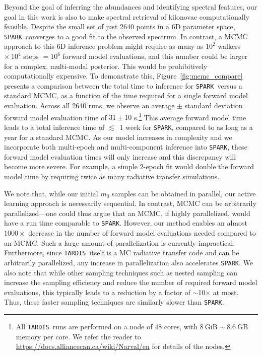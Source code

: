 \documentclass[twocolumn, twocolappendix]{aastex63}
\def\SPARK{\texttt{SPARK}}
\def\TARDIS{\texttt{TARDIS}}
\begin{document}
Beyond the goal of inferring the abundances and identifying spectral features, our goal in this work is also to make spectral retrieval of kilonovae computationally feasible. Despite the small set of just 2640 points in a 6D parameter space, \SPARK~converges to a good fit to the observed spectrum. In contrast, a MCMC approach to this 6D inference problem might require as many as $10^2$ walkers $\times~10^4$ steps $=10^6$ forward model evaluations, and this number could be larger for a complex, multi-modal posterior. This would be prohibitively computationally expensive. To demonstrate this, Figure~\ref{fig:mcmc_compare} presents a comparison between the total time to inference for \SPARK~versus a standard MCMC, as a function of the time required for a single forward model evaluation. Across all 2640 runs, we observe an average $\pm$ standard deviation forward model evaluation time of $31 \pm 10$ s.\footnote{All \TARDIS~runs are performed on a node of 48 cores, with $8~\mathrm{GiB} \sim 8.6~\mathrm{GB}$ memory per core. We refer the reader to \href{https://docs.alliancecan.ca/wiki/Narval/en}{https://docs.alliancecan.ca/wiki/Narval/en} for details of the nodes.} This average forward model time leads to a total inference time of $\lesssim$~1 week for \SPARK, compared to as long as a year for a standard MCMC. As our model increases in complexity and we incorporate both multi-epoch and multi-component inference into \SPARK, these forward model evaluation times will only increase and this discrepancy will become more severe. For example, a simple 2-epoch fit would double the forward model time by requiring twice as many radiative transfer simulations. 

We note that, while our initial $m_0$ samples can be obtained in parallel, our active learning approach is necessarily sequential. In contrast, MCMC can be arbitrarily parallelized---one could thus argue that an MCMC, if highly parallelized, would have a run time comparable to \SPARK. However, our method enables an almost $1000\times$ decrease in the number of forward model evaluations needed compared to an MCMC. Such a large amount of parallelization is currently impractical. Furthermore, since \TARDIS~itself is a MC radiative transfer code and can be arbitrarily parallelized, any increase in parallelization also accelerates \SPARK. We also note that while other sampling techniques such as nested sampling can increase the sampling efficiency and reduce the number of required forward model evaluations, this typically leads to a reduction by a factor of $\sim$10$\times$ at most. Thus, these faster sampling techniques are similarly slower than \SPARK.   
\end{document}
